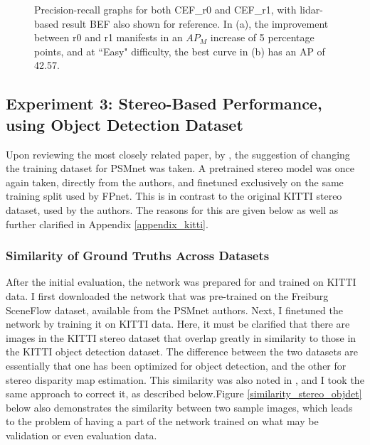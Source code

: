 \begin{figure}[H]
	\centering
	\caption{Precision-recall graphs for both CEF\_r0 and CEF\_r1, with lidar-based result BEF also shown for reference. In (a), the improvement between r0 and r1 manifests in an $AP_M$ increase of 5 percentage points, and at ``Easy" difficulty, the best curve in (b) has an AP of 42.57.}
	\label{fpnet_pr2}
\end{figure}

\subsection{Experiment 3: Stereo-Based Performance, using Object Detection Dataset}
Upon reviewing the most closely related paper, by \cite{wang_pseudo-lidar_2019}, the suggestion of changing the training dataset for PSMnet was taken. A pretrained stereo model was once again taken, directly from the authors, and finetuned exclusively on the same training split used by FPnet. This is in contrast to the original KITTI stereo dataset, used by the authors. The reasons for this are given below as well as further clarified in Appendix \ref{appendix_kitti}.

\subsubsection{Similarity of Ground Truths Across Datasets}
After the initial evaluation, the network was prepared for and trained on KITTI data. I first downloaded the network that was pre-trained on the Freiburg SceneFlow dataset, available from the PSMnet authors. Next, I finetuned the network by training it on KITTI data. Here, it must be clarified that there are images in the KITTI stereo dataset that overlap greatly in similarity to those in the KITTI object detection dataset. The difference between the two datasets are essentially that one has been optimized for object detection, and the other for stereo disparity map estimation. This similarity was also noted in \cite{wang_pseudo-lidar_2019}, and I took the same approach to correct it, as described below.Figure \ref{similarity_stereo_objdet} below also demonstrates the similarity between two sample images, which leads to the problem of having a part of the network trained on what may be validation or even evaluation data.

